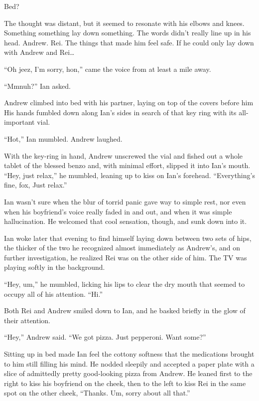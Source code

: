 Bed?

The thought was distant, but it seemed to resonate with his elbows and knees. Something something lay down something. The words didn't really line up in his head. Andrew. Rei. The things that made him feel safe. If he could only lay down with Andrew and Rei\ldots{}

\secdiv{}

``Oh jeez, I'm sorry, hon,'' came the voice from at least a mile away.

``Mmnuh?'' Ian asked.

Andrew climbed into bed with his partner, laying on top of the covers before him His hands fumbled down along Ian's sides in search of that key ring with its all-important vial.

``Hot,'' Ian mumbled. Andrew laughed.

With the key-ring in hand, Andrew unscrewed the vial and fished out a whole tablet of the blessed benzo and, with minimal effort, slipped it into Ian's mouth. ``Hey, just relax,'' he mumbled, leaning up to kiss on Ian's forehead. ``Everything's fine, fox, Just relax.''

Ian wasn't sure when the blur of torrid panic gave way to simple rest, nor even when his boyfriend's voice really faded in and out, and when it was simple hallucination. He welcomed that cool sensation, though, and sunk down into it.

\secdiv{}

Ian woke later that evening to find himself laying down between two sets of hips, the thicker of the two he recognized almost immediately as Andrew's, and on further investigation, he realized Rei was on the other side of him. The TV was playing softly in the background.

``Hey, um,'' he mumbled, licking his lips to clear the dry mouth that seemed to occupy all of his attention. ``Hi.''

Both Rei and Andrew smiled down to Ian, and he basked briefly in the glow of their attention.

``Hey,'' Andrew said. ``We got pizza. Just pepperoni. Want some?''

Sitting up in bed made Ian feel the cottony softness that the medications brought to him still filling his mind. He nodded sleepily and accepted a paper plate with a slice of admittedly pretty good-looking pizza from Andrew. He leaned first to the right to kiss his boyfriend on the cheek, then to the left to kiss Rei in the same spot on the other cheek, ``Thanks. Um, sorry about all that.''

